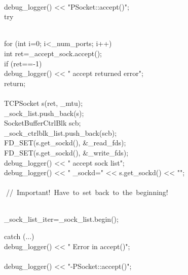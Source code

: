 \documentclass{article}
\begin{document}
 {
\\
     debug_logger() << "PSocket::accept()\n";
\\
     try {
\\
                 for (int i=0; i<_num_ports; i++) {
\\
                         int ret=_accept_sock.accept();
\\
                         if (ret==-1) {
\\
                                 debug_logger() << "    accept returned error\n";
\\
                                 return;
\\
                         }
\\
                         TCPSocket s(ret, _mtu);
\\
                         _sock_list.push_back(s);
\\
                         SocketBufferCtrlBlk scb;
\\
                         _sock_ctrlblk_list.push_back(scb);
\\
                         FD_SET(s.get_sockd(), &_read_fds);
\\
                         FD_SET(s.get_sockd(), &_write_fds);
\\
             debug_logger() << "    accept sock list\n";
\\
             debug_logger() << "         _sockd=" << s.get_sockd()  << "\n";
\\
                 }
\\
         
\hbox{// Important! Have to set back to the beginning!}\strut\\
         _sock_list_iter=_sock_list.begin();
\\
     } catch (...) {
\\
         debug_logger() << "    Error in accept()\n";
\\
     }
\\
     debug_logger() << "-PSocket::accept()\n";        
\\
 }
\\
\end{document}

